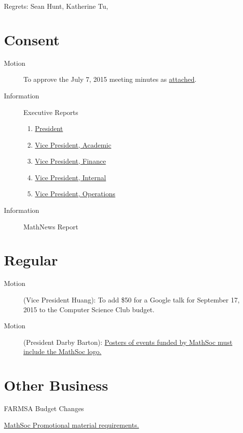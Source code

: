 \documentclass[12pt, letterpaper]{article}
\begin{document}
\hypersetup{} %

\header{}

\noindent
Regrets: Sean Hunt, Katherine Tu, 

\section*{Consent}
\begin{description}
	\item[Motion] To approve the July 7, 2015 meeting minutes as \hyperref[minutes]{attached}.
	\item[Information] Executive Reports
	\begin{enumerate}
		\item \hyperref[president]{President}
		\item \hyperref[vpacademic]{Vice President, Academic}
		\item \hyperref[vpfinance]{Vice President, Finance}
		\item \hyperref[vpinternal]{Vice President, Internal}
		\item \hyperref[vpoperations]{Vice President, Operations}
	\end{enumerate}
	\item[Information] MathNews Report
\end{description}
\HRule

\section*{Regular}
\begin{description}
	\item[Motion] (Vice President Huang): To add \$50 for a Google talk for September 17, 2015 to the Computer Science Club budget.
	\item[Motion] (President Darby Barton): \hyperref[clubs]{Posters of events funded by MathSoc must include the MathSoc logo.}
\end{description}
\HRule

\section*{Other Business}
\begin{description}
	\item FARMSA Budget Changes
	\item \hyperref[clubs]{MathSoc Promotional material requirements.}
\end{description}
\HRule
\end{document}
